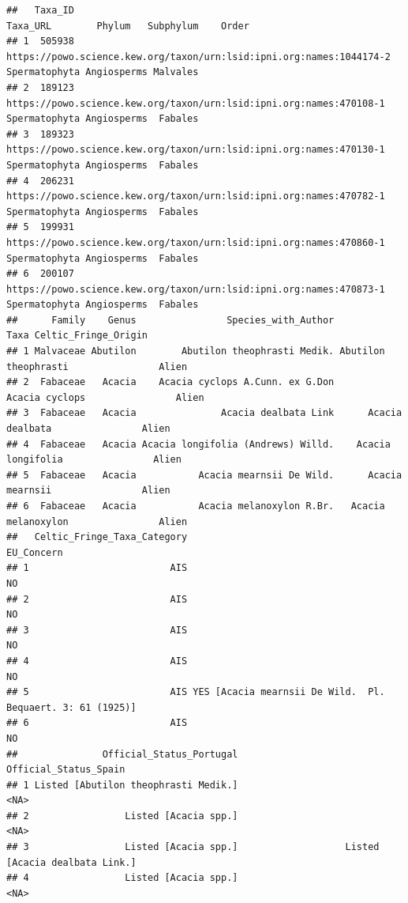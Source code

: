 \documentclass[
]{article}
\begin{document}
\begin{verbatim}
##   Taxa_ID                                                             Taxa_URL        Phylum   Subphylum    Order
## 1  505938 https://powo.science.kew.org/taxon/urn:lsid:ipni.org:names:1044174-2 Spermatophyta Angiosperms Malvales
## 2  189123  https://powo.science.kew.org/taxon/urn:lsid:ipni.org:names:470108-1 Spermatophyta Angiosperms  Fabales
## 3  189323  https://powo.science.kew.org/taxon/urn:lsid:ipni.org:names:470130-1 Spermatophyta Angiosperms  Fabales
## 4  206231  https://powo.science.kew.org/taxon/urn:lsid:ipni.org:names:470782-1 Spermatophyta Angiosperms  Fabales
## 5  199931  https://powo.science.kew.org/taxon/urn:lsid:ipni.org:names:470860-1 Spermatophyta Angiosperms  Fabales
## 6  200107  https://powo.science.kew.org/taxon/urn:lsid:ipni.org:names:470873-1 Spermatophyta Angiosperms  Fabales
##      Family    Genus                Species_with_Author                 Taxa Celtic_Fringe_Origin
## 1 Malvaceae Abutilon        Abutilon theophrasti Medik. Abutilon theophrasti                Alien
## 2  Fabaceae   Acacia    Acacia cyclops A.Cunn. ex G.Don       Acacia cyclops                Alien
## 3  Fabaceae   Acacia               Acacia dealbata Link      Acacia dealbata                Alien
## 4  Fabaceae   Acacia Acacia longifolia (Andrews) Willd.    Acacia longifolia                Alien
## 5  Fabaceae   Acacia           Acacia mearnsii De Wild.      Acacia mearnsii                Alien
## 6  Fabaceae   Acacia           Acacia melanoxylon R.Br.   Acacia melanoxylon                Alien
##   Celtic_Fringe_Taxa_Category                                                 EU_Concern
## 1                         AIS                                                         NO
## 2                         AIS                                                         NO
## 3                         AIS                                                         NO
## 4                         AIS                                                         NO
## 5                         AIS YES [Acacia mearnsii De Wild.  Pl. Bequaert. 3: 61 (1925)]
## 6                         AIS                                                         NO
##               Official_Status_Portugal                            Official_Status_Spain
## 1 Listed [Abutilon theophrasti Medik.]                                             <NA>
## 2                 Listed [Acacia spp.]                                             <NA>
## 3                 Listed [Acacia spp.]                   Listed [Acacia dealbata Link.]
## 4                 Listed [Acacia spp.]                                             <NA>

\end{verbatim}
\end{document}
